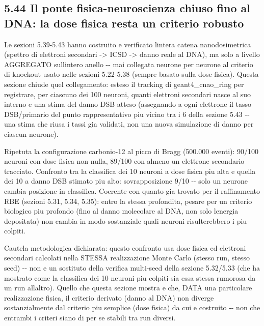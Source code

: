 \documentclass[
  italian,
]{article}
\begin{document}
\subsection{5.44 Il ponte fisica-neuroscienza chiuso fino al DNA: la dose fisica resta un criterio robusto}\label{il-ponte-fisica-neuroscienza-chiuso-fino-al-dna-la-dose-fisica-resta-un-criterio-robusto}

Le sezioni 5.39-5.43 hanno costruito e verificato l\textquotesingle intera catena nanodosimetrica (spettro di elettroni secondari -\textgreater{} ICSD -\textgreater{} danno reale al DNA), ma solo a livello AGGREGATO sull\textquotesingle intero anello -\/- mai collegata neurone per neurone al criterio di knockout usato nelle sezioni 5.22-5.38 (sempre basato sulla dose fisica). Questa sezione chiude quel collegamento: esteso il tracking di geant4\_\allowbreak{}cnao\_\allowbreak{}ring per registrare, per ciascuno dei 100 neuroni, quanti elettroni secondari nasce al suo interno e una stima del danno DSB atteso (assegnando a ogni elettrone il tasso DSB/primario del punto rappresentativo piu\textquotesingle{} vicino tra i 6 della sezione 5.43 -\/- una stima che riusa i tassi gia\textquotesingle{} validati, non una nuova simulazione di danno per ciascun neurone).

Ripetuta la configurazione carbonio-12 al picco di Bragg (500.000 eventi): 90/100 neuroni con dose fisica non nulla, 89/100 con almeno un elettrone secondario tracciato. Confronto tra la classifica dei 10 neuroni a dose fisica piu\textquotesingle{} alta e quella dei 10 a danno DSB stimato piu\textquotesingle{} alto: sovrapposizione 9/10 -\/- solo un neurone cambia posizione in classifica. Coerente con quanto gia\textquotesingle{} trovato per il raffinamento RBE (sezioni 5.31, 5.34, 5.35): entro la stessa profondita\textquotesingle, pesare per un criterio biologico piu\textquotesingle{} profondo (fino al danno molecolare al DNA, non solo l\textquotesingle energia depositata) non cambia in modo sostanziale quali neuroni risulterebbero i piu\textquotesingle{} colpiti.

Cautela metodologica dichiarata: questo confronto usa dose fisica ed elettroni secondari calcolati nella STESSA realizzazione Monte Carlo (stesso run, stesso seed) -\/- non e\textquotesingle{} un sostituto della verifica multi-seed della sezione 5.32/5.33 (che ha mostrato come la classifica dei 10 neuroni piu\textquotesingle{} colpiti sia essa stessa rumorosa da un run all\textquotesingle altro). Quello che questa sezione mostra e\textquotesingle{} che, DATA una particolare realizzazione fisica, il criterio derivato (danno al DNA) non diverge sostanzialmente dal criterio piu\textquotesingle{} semplice (dose fisica) da cui e\textquotesingle{} costruito -\/- non che entrambi i criteri siano di per se\textquotesingle{} stabili tra run diversi.
\end{document}
